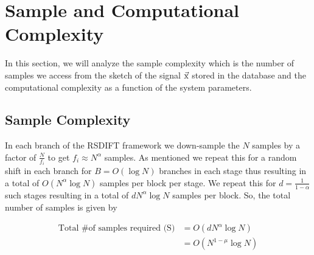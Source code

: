 \section{Sample and Computational Complexity}
\label{Sec:Complexity}
In this section, we will analyze the sample complexity which is the  number of samples we access from the sketch of the signal $\vec{\mathrm{x}}$ stored in the database and the computational complexity as a function of the system parameters.

\subsection{\bf Sample Complexity}
In each branch of the RSDIFT framework we down-sample the $N$ samples by a factor of $\frac{N}{f_i}$ to get $f_i\approx N^{\alpha}$ samples. As mentioned we repeat this for a random shift in each branch for $B=O(\log N)$ branches in each stage thus resulting in a total of $O(N^{\alpha}\log N)$ samples per block per stage. We repeat this for $d = \frac{1}{1-\alpha}$ such stages resulting in a total of $dN^{\alpha}\log N$ samples per block. So, the total number of samples is given by  

\begin{align*}
\text{Total \# of samples required (S)} &= O \left(dN^{\alpha}\log N\right)\\
   &=   O(N^{1-\mu}\log N)
\end{align*}




